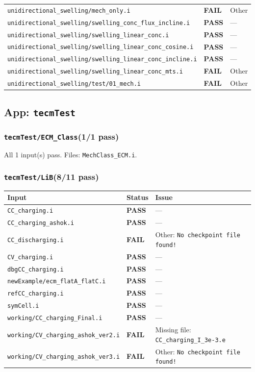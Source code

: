 \documentclass[10pt,letterpaper]{article}
\newcommand{\PASS}{\textcolor{passgreen}{\textbf{PASS}}}
\newcommand{\FAIL}{\textcolor{failred}{\textbf{FAIL}}}
\newcommand{\code}[1]{\texttt{\small #1}}
\begin{document}
\begin{longtable}{p{} l p{}}
\code{unidirectional\_swelling/mech\_only.i} & \FAIL & Other \\
\code{unidirectional\_swelling/swelling\_conc\_flux\_incline.i} & \PASS & --- \\
\code{unidirectional\_swelling/swelling\_linear\_conc.i} & \PASS & --- \\
\code{unidirectional\_swelling/swelling\_linear\_conc\_cosine.i} & \PASS & --- \\
\code{unidirectional\_swelling/swelling\_linear\_conc\_incline.i} & \PASS & --- \\
\code{unidirectional\_swelling/swelling\_linear\_conc\_mts.i} & \FAIL & Other \\
\code{unidirectional\_swelling/test/01\_mech.i} & \FAIL & Other \\
\bottomrule
\end{longtable}

\subsection{App: \code{tecmTest}}
\subsubsection{\code{tecmTest/ECM\_Class}\hfill (1/1 pass)}
All 1 input(s) pass. Files: \code{MechClass\_ECM.i}.

\subsubsection{\code{tecmTest/LiB}\hfill (8/11 pass)}
\begin{longtable}{p{} l p{}}
\toprule
Input & Status & Issue \\
\midrule
\endhead
\code{CC\_charging.i} & \PASS & --- \\
\code{CC\_charging\_ashok.i} & \PASS & --- \\
\code{CC\_discharging.i} & \FAIL & Other: \code{No checkpoint file found!} \\
\code{CV\_charging.i} & \PASS & --- \\
\code{dbgCC\_charging.i} & \PASS & --- \\
\code{newExample/ecm\_flatA\_flatC.i} & \PASS & --- \\
\code{refCC\_charging.i} & \PASS & --- \\
\code{symCell.i} & \PASS & --- \\
\code{working/CC\_charging\_Final.i} & \PASS & --- \\
\code{working/CV\_charging\_ashok\_ver2.i} & \FAIL & Missing file: \code{CC\_charging\_I\_3e-3.e} \\
\code{working/CV\_charging\_ashok\_ver3.i} & \FAIL & Other: \code{No checkpoint file found!} \\
\bottomrule
\end{longtable}
\end{document}
